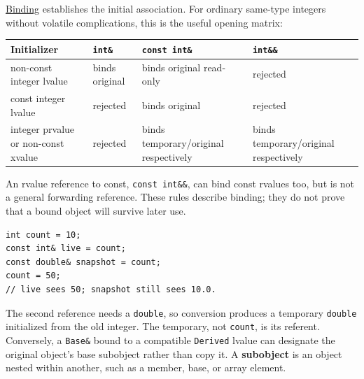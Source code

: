\hypertarget{01-foundations-i-ch003-binding-chooses-a-referent-not-always-the-one-you-imagined}{}

\hyperref[appendix-37856d997bb0]{Binding} establishes the initial association. For ordinary same-type integers without volatile complications, this is the useful opening matrix:

{\def\LTcaptype{none} %
\begin{longtable}[]{@{}
  >{\raggedright\arraybackslash}p{}
  >{\raggedright\arraybackslash}p{}
  >{\raggedright\arraybackslash}p{}
  >{\raggedright\arraybackslash}p{}@{}}
\toprule\noalign{}
\begin{minipage}[b]{\linewidth}\raggedright
Initializer
\end{minipage} & \begin{minipage}[b]{\linewidth}\raggedright
\texttt{int\&}
\end{minipage} & \begin{minipage}[b]{\linewidth}\raggedright
\texttt{const\ int\&}
\end{minipage} & \begin{minipage}[b]{\linewidth}\raggedright
\texttt{int\&\&}
\end{minipage} \\
\midrule\noalign{}
\endhead
\bottomrule\noalign{}
\endlastfoot
non-const integer lvalue & binds original & binds original read-only & rejected \\
const integer lvalue & rejected & binds original & rejected \\
integer prvalue or non-const xvalue & rejected & binds temporary/original respectively & binds temporary/original respectively \\
\end{longtable}
}

An rvalue reference to const, \texttt{const\ int\&\&}, can bind const rvalues too, but is not a general forwarding reference. These rules describe binding; they do not prove that a bound object will survive later use.

\begin{verbatim}
int count = 10;
const int& live = count;
const double& snapshot = count;
count = 50;
// live sees 50; snapshot still sees 10.0.
\end{verbatim}

The second reference needs a \texttt{double}, so conversion produces a temporary \texttt{double} initialized from the old integer. The temporary, not \texttt{count}, is its referent. Conversely, a \texttt{Base\&} bound to a compatible \texttt{Derived} lvalue can designate the original object's base subobject rather than copy it. A \textbf{subobject} is an object nested within another, such as a member, base, or array element.

